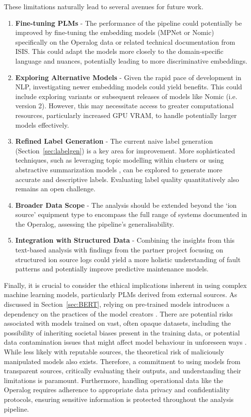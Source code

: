 \documentclass[10pt,oneside]{report}
\begin{document}
These limitations naturally lead to several avenues for future work.
\begin{enumerate}
    \item \textbf{Fine-tuning PLMs} - The performance of the pipeline could potentially be improved by fine-tuning the embedding models (MPNet or Nomic) specifically on the Operalog data or related technical documentation from ISIS. This could adapt the models more closely to the domain-specific language and nuances, potentially leading to more discriminative embeddings.
    \item \textbf{Exploring Alternative Models} - Given the rapid pace of development in NLP, investigating newer embedding models could yield benefits. This could include exploring variants or subsequent releases of models like Nomic (i.e. version 2). However, this may necessitate access to greater computational resources, particularly increased GPU VRAM, to handle potentially larger models effectively.
    \item \textbf{Refined Label Generation} - The current naive label generation (Section~\ref{sec:labelgen}) is a key area for improvement. More sophisticated techniques, such as leveraging topic modelling \cite{curiskis2020evaluation} within clusters or using abstractive summarization models \cite{nallapati2016abstractive}, can be explored to generate more accurate and descriptive labels. Evaluating label quality quantitatively also remains an open challenge.
    \item \textbf{Broader Data Scope} - The analysis should be extended beyond the `ion source' equipment type to encompass the full range of systems documented in the Operalog, assessing the pipeline's generalisability.
    \item \textbf{Integration with Structured Data} - Combining the insights from this text-based analysis with findings from the partner project focusing on structured ion source logs could yield a more holistic understanding of fault patterns and potentially improve predictive maintenance models.
\end{enumerate}

Finally, it is crucial to consider the ethical implications inherent in using complex machine learning models, particularly PLMs derived from external sources. As discussed in Section~\ref{sec:BERT}, relying on pre-trained models introduces a dependency on the practices of the model creators \cite{wolf2019huggingface}. There are potential risks associated with models trained on vast, often opaque datasets, including the possibility of inheriting societal biases present in the training data, or potential data contamination issues that might affect model behaviour in unforeseen ways \cite{min2023recent}. While less likely with reputable sources, the theoretical risk of maliciously manipulated models also exists. Therefore, a commitment to using models from transparent sources, critically evaluating their outputs, and understanding their limitations is paramount. Furthermore, handling operational data like the Operalog requires adherence to appropriate data privacy and confidentiality protocols, ensuring sensitive information is protected throughout the analysis pipeline. \\
\end{document}
